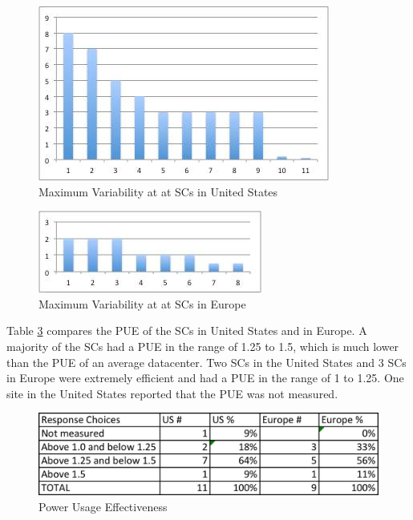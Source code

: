 \documentclass{article}
\begin{document}
\begin{figure}
\begin{center}
\includegraphics[scale=0.8]{figs/USVar.jpg}
\caption{Maximum Variability at at SCs in United States}
\label{fig:USvar}
\end{center}
\end{figure}

\begin{figure}
\begin{center}
\includegraphics[scale=0.8]{figs/EUVar.jpg}
\caption{Maximum Variability at at SCs in Europe}
\label{fig:EUvar}
\end{center}
\end{figure}

Table \ref{fig:pue} compares the PUE of the SCs in United States and in Europe. A majority of the SCs had a PUE in the range of 1.25 to 1.5, which is much lower than the PUE of an average datacenter. Two SCs in the United States and 3 SCs in Europe were extremely efficient and had a PUE in the range of 1 to 1.25. One site in the United States reported that the PUE was not measured.

\begin{figure}
\begin{center}
\includegraphics[scale=0.5]{figs/Table1.jpg}
\caption{Power Usage Effectiveness}
\label{fig:pue}
\end{center}
\end{figure}
\end{document}
